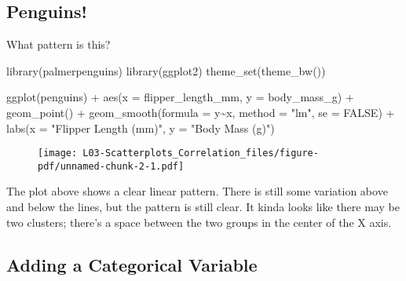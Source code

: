 \documentclass[
  letterpaper,
  DIV=11,
  numbers=noendperiod]{scrreprt}
\newenvironment{Shaded}{\begin{snugshade}}{\end{snugshade}}
\newcommand{\AttributeTok}[1]{\textcolor[rgb]{0.40,0.45,0.13}{#1}}
\newcommand{\ConstantTok}[1]{\textcolor[rgb]{0.56,0.35,0.01}{#1}}
\newcommand{\FunctionTok}[1]{\textcolor[rgb]{0.28,0.35,0.67}{#1}}
\newcommand{\NormalTok}[1]{\textcolor[rgb]{0.00,0.23,0.31}{#1}}
\newcommand{\SpecialCharTok}[1]{\textcolor[rgb]{0.37,0.37,0.37}{#1}}
\newcommand{\StringTok}[1]{\textcolor[rgb]{0.13,0.47,0.30}{#1}}
\begin{document}
\hypertarget{penguins}{%
\subsection{Penguins!}\label{penguins}}

\vspace{1cm}

What pattern is this?

\begin{Shaded}
\begin{Highlighting}[]
\FunctionTok{library}\NormalTok{(palmerpenguins)}
\FunctionTok{library}\NormalTok{(ggplot2)}
\FunctionTok{theme\_set}\NormalTok{(}\FunctionTok{theme\_bw}\NormalTok{())}

\FunctionTok{ggplot}\NormalTok{(penguins) }\SpecialCharTok{+} 
    \FunctionTok{aes}\NormalTok{(}\AttributeTok{x =}\NormalTok{ flipper\_length\_mm, }\AttributeTok{y =}\NormalTok{ body\_mass\_g) }\SpecialCharTok{+}
    \FunctionTok{geom\_point}\NormalTok{() }\SpecialCharTok{+} 
    \FunctionTok{geom\_smooth}\NormalTok{(}\AttributeTok{formula =}\NormalTok{ y}\SpecialCharTok{\textasciitilde{}}\NormalTok{x, }\AttributeTok{method =} \StringTok{"lm"}\NormalTok{, }\AttributeTok{se =} \ConstantTok{FALSE}\NormalTok{) }\SpecialCharTok{+}
    \FunctionTok{labs}\NormalTok{(}\AttributeTok{x =} \StringTok{"Flipper Length (mm)"}\NormalTok{,}
        \AttributeTok{y =} \StringTok{"Body Mass (g)"}\NormalTok{)}
\end{Highlighting}
\end{Shaded}

\begin{figure}[H]

{\centering \texttt{[image: L03-Scatterplots\_Correlation\_files/figure-pdf/unnamed-chunk-2-1.pdf]}

}

\end{figure}

The plot above shows a clear linear pattern. There is still some
variation above and below the lines, but the pattern is still clear. It
kinda looks like there may be two clusters; there's a space between the
two groups in the center of the X axis.

\hypertarget{adding-a-categorical-variable}{%
\subsection{Adding a Categorical
Variable}\label{adding-a-categorical-variable}}
\end{document}
